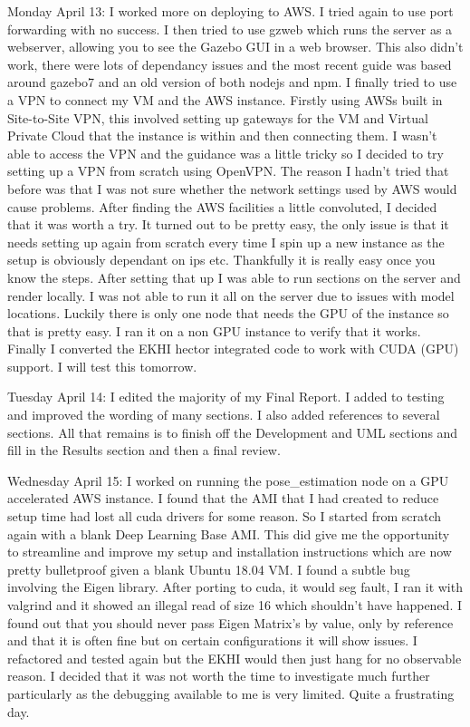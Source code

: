 \documentclass[]{../resources/final_report}
\begin{document}
\begin{appendices}
  Monday April 13: I worked more on deploying to AWS. I tried again to use port forwarding with no success. I then tried to use gzweb which runs the server as a webserver, allowing you to see the Gazebo GUI in a web browser. This also didn’t work, there were lots of dependancy issues and the most recent guide was based around gazebo7 and an old version of both nodejs and npm. I finally tried to use a VPN to connect my VM and the AWS instance. Firstly using AWSs built in Site-to-Site VPN, this involved setting up gateways for the VM and Virtual Private Cloud that the instance is within and then connecting them. I wasn’t able to access the VPN and the guidance was a little tricky so I decided to try setting up a VPN from scratch using OpenVPN. The reason I hadn’t tried that before was that I was not sure whether the network settings used by AWS would cause problems. After finding the AWS facilities a little convoluted, I decided that it was worth a try. It turned out to be pretty easy, the only issue is that it needs setting up again from scratch every time I spin up a new instance as the setup is obviously dependant on ips etc. Thankfully it is really easy once you know the steps. After setting that up I was able to run sections on the server and render locally. I was not able to run it all on the server due to issues with model locations. Luckily there is only one node that needs the GPU of the instance so that is pretty easy. I ran it on a non GPU instance to verify that it works. Finally I converted the EKHI hector integrated code to work with CUDA (GPU) support. I will test this tomorrow.

  Tuesday April 14: I edited the majority of my Final Report. I added to testing and improved the wording of many sections. I also added references to several sections. All that remains is to finish off the Development and UML sections and fill in the Results section and then a final review.

  Wednesday April 15: I worked on running the pose\_estimation node on a GPU accelerated AWS instance. I found that the AMI that I had created to reduce setup time had lost all cuda drivers for some reason. So I started from scratch again with a blank Deep Learning Base AMI. This did give me the opportunity to streamline and improve my setup and installation instructions which are now pretty bulletproof given a blank Ubuntu 18.04 VM. I found a subtle bug involving the Eigen library. After porting to cuda, it would seg fault, I ran it with valgrind and it showed an illegal read of size 16 which shouldn’t have happened. I found out that you should never pass Eigen Matrix’s by value, only by reference and that it is often fine but on certain configurations it will show issues. I refactored and tested again but the EKHI would then just hang for no observable reason. I decided that it was not worth the time to investigate much further particularly as the debugging available to me is very limited. Quite a frustrating day.


\end{appendices}
\end{document}
